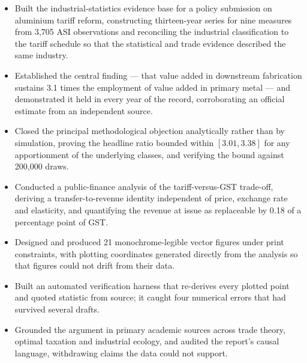 \documentclass[11pt, a4paper]{article}
\begin{document}
\begin{itemize}[leftmargin=1.4em, itemsep=4pt]
\item Built the industrial-statistics evidence base for a policy submission on
aluminium tariff reform, constructing thirteen-year series for nine measures from
3,705 ASI observations and reconciling the industrial classification to the tariff
schedule so that the statistical and trade evidence described the same industry.

\item Established the central finding --- that value added in downstream fabrication
sustains 3.1 times the employment of value added in primary metal --- and demonstrated
it held in every year of the record, corroborating an official estimate from an
independent source.

\item Closed the principal methodological objection analytically rather than by
simulation, proving the headline ratio bounded within $[3.01, 3.38]$ for any
apportionment of the underlying classes, and verifying the bound against 200,000
draws.

\item Conducted a public-finance analysis of the tariff-versus-GST trade-off,
deriving a transfer-to-revenue identity independent of price, exchange rate and
elasticity, and quantifying the revenue at issue as replaceable by 0.18 of a
percentage point of GST.

\item Designed and produced 21 monochrome-legible vector figures under print
constraints, with plotting coordinates generated directly from the analysis so that
figures could not drift from their data.

\item Built an automated verification harness that re-derives every plotted point and
quoted statistic from source; it caught four numerical errors that had survived
several drafts.

\item Grounded the argument in primary academic sources across trade theory, optimal
taxation and industrial ecology, and audited the report's causal language, withdrawing
claims the data could not support.
\end{itemize}
\end{document}
